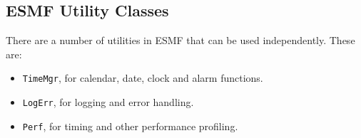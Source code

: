 \subsection{ESMF Utility Classes}

There are a number of utilities in ESMF that can be used independently.
These are:
\begin{itemize}
\item {\tt TimeMgr}, for calendar, date, clock and alarm functions.
\item {\tt LogErr}, for logging and error handling.
\item {\tt Perf}, for timing and other performance profiling.
\end{itemize}

